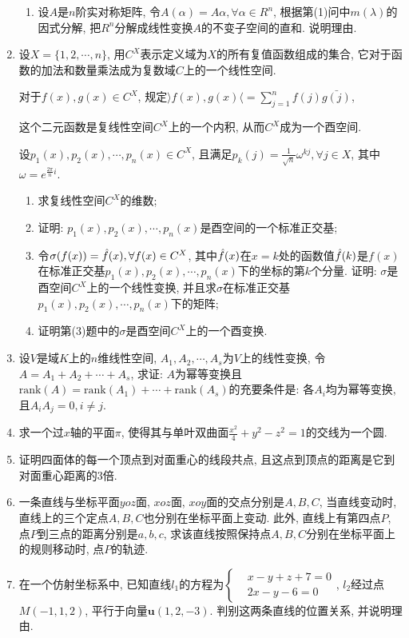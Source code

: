 \documentclass[12pt,a4paper,openany]{book}
\begin{document}
\begin{enumerate}
\begin{enumerate}
\item 设$A$是$n$阶实对称矩阵, 令$A(\alpha) = A\alpha, \forall \alpha \in R^n$, 根据第(1)问中$m(\lambda)$的因式分解, 把$R^n$分解成线性变换$A$的不变子空间的直和. 说明理由.
\end{enumerate}

\item 设$X = \{1, 2, \cdots, n\}$, 用$C^X$表示定义域为$X$的所有复值函数组成的集合, 它对于函数的加法和数量乘法成为复数域$C$上的一个线性空间.

对于$f(x), g(x) \in C^X$, 规定$\rangle f(x), g(x) \langle = \sum\limits_{j=1}^{n}{f(j)\bar{g(j)}}$,

这个二元函数是复线性空间$C^X$上的一个内积, 从而$C^X$成为一个酉空间.

设$p_1(x), p_2(x), \cdots, p_n(x) \in C^X$, 且满足$p_k(j) = \displaystyle\frac{1}{\sqrt{n}}\omega^{kj}, \forall j \in X$, 其中$\omega = e^{\frac{2\pi}{n}i}$.
\begin{enumerate}
\item 求复线性空间$C^X$的维数;
\item 证明: $p_1(x), p_2(x), \cdots, p_n(x)$是酉空间的一个标准正交基;
\item 令$\sigma(f(x)) = \Hat{f}(x), \forall f(x) \in C^X$, 其中$\Hat{f}(x)$在$x = k$处的函数值$\Hat{f}(k)$是$f(x)$在标准正交基$p_1(x), p_2(x), \cdots, p_n(x)$下的坐标的第$k$个分量. 证明: $\sigma$是酉空间$C^X$上的一个线性变换, 并且求$\sigma$在标准正交基$p_1(x), p_2(x), \cdots, p_n(x)$下的矩阵;
\item 证明第(3)题中的$\sigma$是酉空间$C^X$上的一个酉变换.
\end{enumerate}

\item 设$V$是域$K$上的$n$维线性空间, $A_1, A_2, \cdots, A_s$为$V$上的线性变换, 令$A = A_1 + A_2 + \cdots + A_s$, 求证: $A$为幂等变换且$\text{rank}(A) = \text{rank}(A_1) + \cdots + \text{rank}(A_s)$的充要条件是: 各$A_i$均为幂等变换, 且$A_iA_j = 0, i \neq j$.

\item 求一个过$x$轴的平面$\pi$, 使得其与单叶双曲面$\displaystyle\frac{x^2}{4} + y^2 - z^2 = 1$的交线为一个圆.

\item 证明四面体的每一个顶点到对面重心的线段共点, 且这点到顶点的距离是它到对面重心距离的3倍.

\item 一条直线与坐标平面$yoz$面, $xoz$面, $xoy$面的交点分别是$A, B, C$, 当直线变动时, 直线上的三个定点$A, B, C$也分别在坐标平面上变动. 此外, 直线上有第四点$P$, 点$P$到三点的距离分别是$a, b, c$, 求该直线按照保持点$A, B, C$分别在坐标平面上的规则移动时, 点$P$的轨迹.

\item 在一个仿射坐标系中, 已知直线$l_1$的方程为$\left\{ \begin{aligned} &x - y + z + 7 = 0 \\ &2x - y - 6 = 0 \end{aligned} \right.$, $l_2$经过点$M(-1, 1, 2)$, 平行于向量$\bm{u}(1, 2, -3)$. 判别这两条直线的位置关系, 并说明理由.
\end{enumerate}
\end{document}
